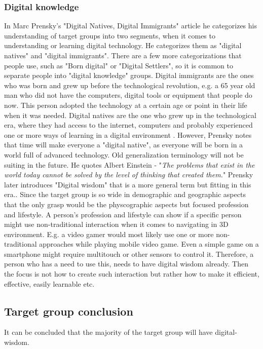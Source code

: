 \subsubsection{Digital knowledge}
In Marc Prensky's "Digital Natives, Digital Immigrants" \cite{DigitalImmigrants} article he categorizes his understanding of target groups into two segments, when it comes to understanding or learning digital technology. He categorizes them as "digital natives" and "digital immigrants". There are a few more categorizations that people use, such as "Born digital" or "Digital Settlers", so it is common to separate people into "digital knowledge" groups.
Digital immigrants are the ones who was born and grew up before the technological revolution, e.g. a 65 year old man who did not have the computers, digital tools or equipment that people do now. This person adopted the technology at a certain age or point in their life when it was needed. 
Digital natives are the one who grew up in the technological era, where they had access to the internet, computers and probably experienced one or more ways of learning in a digital environment \cite{DigitalImmigrants}. However, Prensky notes that time will make everyone a "digital native", as everyone will be born in a world full of advanced technology. Old generalization terminology will not be suiting in the future. He quotes Albert Einstein - "\textit{The problems that exist in the world today cannot be solved by the level of thinking that created them.}" Prensky later introduces "Digital wisdom" that is a more general term but fitting in this era.\cite{DigitaIWisdom}. Since the target group is so wide in demographic and geographic aspects that the only grasp  would be the physcographic aspects but focused profession and lifestyle. A person's profession and lifestyle can show if a specific person might use non-traditional interaction when it comes to navigating in 3D environment. E.g. a video gamer would most likely use one or more non-traditional approaches while playing mobile video game. Even a simple game on a smartphone might require multitouch or other sensors to control it.  
Therefore, a person who has a need to use this, needs to have digital wisdom already. Then the focus is not how to create such interaction but rather how to make it efficient, effective, easily learnable etc. %

\subsection{Target group conclusion}
It can be concluded that the majority of the target group will have digital-wisdom.